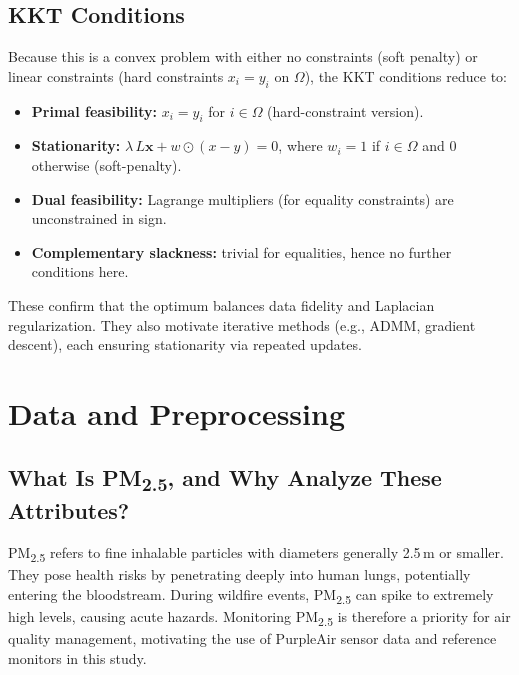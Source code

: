 \documentclass[12pt]{article}                                %
\begin{document}
\subsection{KKT Conditions}  %
Because this is a convex problem with either no constraints (soft penalty) or linear constraints 
(hard constraints $x_i = y_i$ on $\Omega$), the KKT conditions reduce to:
\begin{itemize}
    \item \textbf{Primal feasibility:} $x_i = y_i$ for $i\in\Omega$ (hard-constraint version).
    \item \textbf{Stationarity:} $\lambda\,L\mathbf{x} + w \odot (x - y) = 0$, 
          where $w_i = 1$ if $i\in\Omega$ and $0$ otherwise (soft-penalty).
    \item \textbf{Dual feasibility:} Lagrange multipliers (for equality constraints) are unconstrained in sign.
    \item \textbf{Complementary slackness:} trivial for equalities, hence no further conditions here.
\end{itemize}
These confirm that the optimum balances data fidelity and Laplacian regularization. They also 
motivate iterative methods (e.g., ADMM, gradient descent), each ensuring stationarity via 
repeated updates.

\section{Data and Preprocessing}
\label{sec:data}           %

\subsection{What Is PM\textsubscript{2.5}, and Why Analyze These Attributes?}   %
PM\textsubscript{2.5} refers to fine inhalable particles with diameters generally 2.5\,\textmu m 
or smaller. They pose health risks by penetrating deeply into human lungs, potentially entering 
the bloodstream. During wildfire events, PM\textsubscript{2.5} can spike to extremely high levels, 
causing acute hazards. Monitoring PM\textsubscript{2.5} is therefore a priority for air quality 
management, motivating the use of PurpleAir sensor data and reference monitors in this study.
\end{document}
